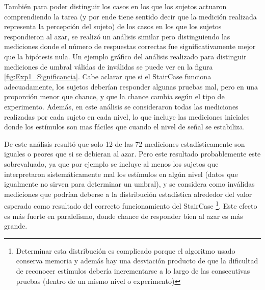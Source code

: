 \documentclass{article}
\numberwithin{figure}{section}
\begin{document}
    También para poder distinguir los casos en los que los sujetos actuaron comprendiendo la tarea (y por ende tiene sentido decir que la medición realizada representa la percepción del sujeto) de los casos en los que los sujetos respondieron al azar, se realizó un análisis similar pero distinguiendo las mediciones donde el número de respuestas correctas fue significativamente mejor que la hipótesis nula. Un ejemplo gráfico del análisis realizado para distinguir mediciones de umbral válidas de inválidas se puede ver en la figura \ref{fig:Exp1_Significancia}. Cabe aclarar que si el StairCase funciona adecuadamente, los sujetos deberían responder algunas pruebas mal, pero en una proporción menor que chance, y que la chance cambia según el tipo de experimento. Además, en este análisis se consideraron todas las mediciones realizadas por cada sujeto en cada nivel, lo que incluye las mediciones iniciales donde los estímulos son mas fáciles que cuando el nivel de señal se estabiliza. 
    
    De este análisis resultó que solo 12 de las 72 mediciones estadísticamente son iguales o peores que si se debieran al azar. Pero este resultado probablemente este sobrevaluado, ya que por ejemplo se incluye al menos los sujetos que interpretaron sistemáticamente mal los estímulos en algún nivel (datos que igualmente no sirven para determinar un umbral), y se considera como inválidas mediciones que podrían deberse a la distribución estadística alrededor del valor esperado como resultado del correcto funcionamiento del StairCase \footnote{Determinar esta distribución es complicado porque el algoritmo usado conserva memoria y además hay una desviación producto de que la dificultad de reconocer estímulos debería incrementarse a lo largo de las consecutivas pruebas (dentro de un mismo nivel o experimento)}. Este efecto es más fuerte en paralelismo, donde chance de responder bien al azar es más grande.
	
	
\end{document}
